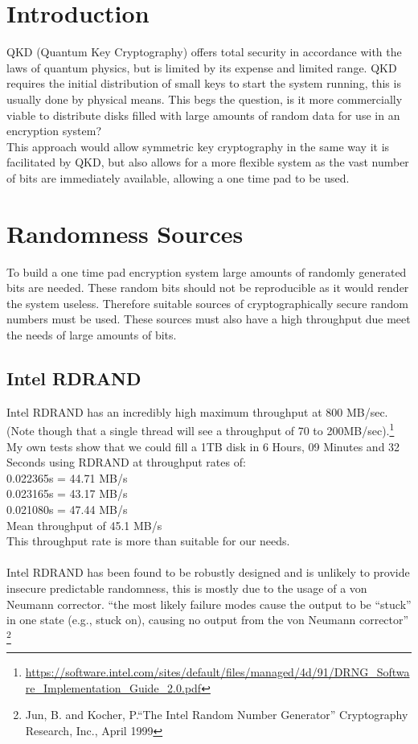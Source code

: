 \documentclass{paper}
\begin{document}
	\maketitle
	\section{Introduction}
		QKD (Quantum Key Cryptography) offers total security in accordance with the laws of quantum physics, but is limited by its expense and limited range. QKD requires the initial distribution of small keys to start the system running, this is usually done by physical means. This begs the question, is it more commercially viable to distribute disks filled with large amounts of random data for use in an encryption system?\\
		This approach would allow symmetric key cryptography in the same way it is facilitated by QKD, but also allows for a more flexible system as the vast number of bits are immediately available, allowing a one time pad to be used.\\
		
	
	\section{Randomness Sources}
		To build a one time pad encryption system large amounts of randomly generated bits are needed. These random bits should not be reproducible as it would render the system useless. Therefore suitable sources of cryptographically secure random numbers must be used. These sources must also have a high throughput due meet the needs of large amounts of bits.\\ 
	
		\subsection{Intel RDRAND}
			Intel RDRAND has an incredibly high maximum throughput at 800 MB/sec. (Note though that a single thread will see a throughput of 70 to 200MB/sec).\footnote{\url{https://software.intel.com/sites/default/files/managed/4d/91/DRNG_Software_Implementation_Guide_2.0.pdf}} \\
			My own tests show that we could fill a 1TB disk in 6 Hours, 09 Minutes and 32 Seconds using RDRAND at throughput rates of:\\
			0.022365s = 44.71 MB/s\\
			0.023165s = 43.17 MB/s\\
			0.021080s = 47.44 MB/s\\
			Mean throughput of 45.1 MB/s\\
			This throughput rate is more than suitable for our needs.\\\\
			Intel RDRAND has been found to be robustly designed and is unlikely to provide insecure predictable randomness, this is mostly due to the usage of a von Neumann corrector. ``the most likely failure modes cause the output to be “stuck” in one state (e.g., stuck on), causing no output from the von Neumann corrector'' \footnote{Jun, B. and Kocher, P.``The Intel Random Number Generator'' Cryptography Research, Inc., April 1999}
\end{document}
